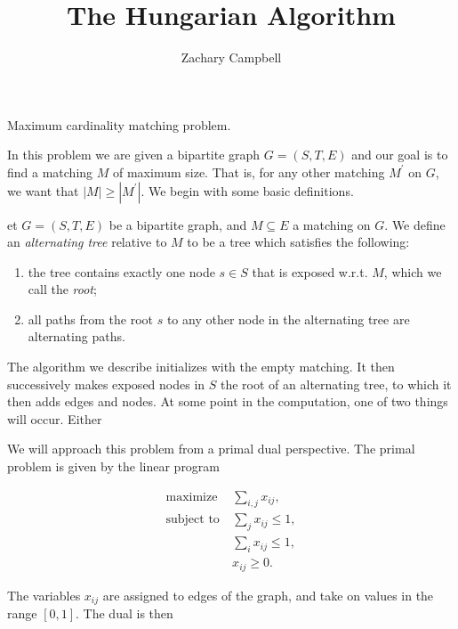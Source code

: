 \documentclass[11pt]{article}
\renewcommand{\'}{^{'}}
\newenvironment{definition}[2][Definition]{\begin{trivlist}
\item[\hskip \labelsep {\bfseries #1}\hskip \labelsep {\bfseries #2.}]}{\end{trivlist}}
\begin{document}
\title{The Hungarian Algorithm}
\author{Zachary Campbell}

\maketitle


\begin{section}{Maximum cardinality matching problem.}

In this problem we are given a bipartite graph $G = (S,T,E)$ and our goal is to 
find a matching $M$ of maximum size. That is, for any other matching $M^{'}$ on $G$, we 
want that $|M| \geq |M^{'}|$. We begin with some basic definitions.

\begin{definition}
	Let $G = (S,T,E)$ be a bipartite graph, and $M \subseteq E$ a matching on $G$. We define 
	an \emph{alternating tree} relative to $M$ to be a tree which satisfies the following:
	\begin{enumerate}
		\item the tree contains exactly one node $s\in S$ that is exposed w.r.t. $M$, which 
			we call the \emph{root};
		\item all paths from the root $s$ to any other node in the alternating tree 
			are alternating paths.
	\end{enumerate}
\end{definition}

The algorithm we describe initializes with the empty matching. It then successively makes exposed 
nodes in $S$ the root of an alternating tree, to which it then adds edges and nodes. At some point 
in the computation, one of two things will occur. Either 

We will approach this problem from a primal dual perspective. The primal problem is 
given by the linear program 

\begin{align*}
	\text{maximize}\ &\sum_{i,j} x_{ij},\\
	\text{subject to}\ &\sum_j x_{ij} \leq 1,\\
	                   &\sum_i x_{ij} \leq 1,\\
			   &x_{ij} \geq 0.
\end{align*}

The variables $x_{ij}$ are assigned to edges of the graph, and take on values in the 
range $[0,1]$. The dual is then 


\end{section}
\end{document}
